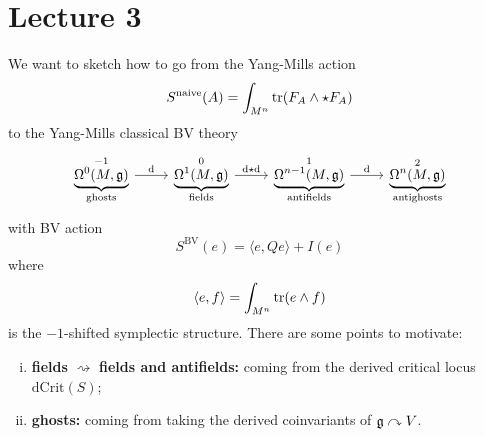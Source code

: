 \chapter{Lecture 3}

We want to sketch how to go from the Yang-Mills action
\begin{equation*}
  S^{\text{naive}} (A) = \int_{M^n} \operatorname{tr} (F_A \wedge \star F_A)
\end{equation*}
to the Yang-Mills classical BV theory
\begin{equation*}
  \begin{tikzcd}
    \underbrace{\Omega^0 (M, \gfrak)}_{\text{ghosts}}^{-1}
    \arrow[r, "\drm"] &
    \underbrace{\Omega^1 (M, \gfrak)}_{\text{fields}}^{0}
    \arrow[r, "\drm \star \drm"] &
    \underbrace{\Omega^{n-1} (M, \gfrak)}_{\text{antifields}}^{1}
    \arrow[r, "\drm"] &
    \underbrace{\Omega^n (M, \gfrak)}_{\text{antighosts}}^{2}
  \end{tikzcd}
\end{equation*}
with BV action
\begin{equation*}
  S^{\text{BV}}(e) = \langle e, Q e \rangle + I(e)
\end{equation*}
where
\begin{equation*}
  \langle e, f \rangle = \int_{M^n} \operatorname{tr} (e \wedge f)
\end{equation*}
is the $-1$-shifted symplectic structure. There are some points to motivate:
\begin{enumerate}[i)]
  \item \textbf{fields} $\rightsquigarrow$ \textbf{fields and antifields:} coming from the derived critical locus $\text{dCrit}(S)$;
  \item \textbf{ghosts:} coming from taking the derived coinvariants of $\mathfrak{g} \curvearrowright V$.
\end{enumerate}

